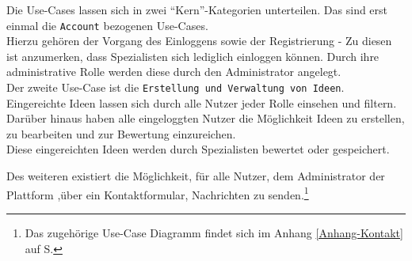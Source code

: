 Die Use-Cases lassen sich in zwei \enquote{Kern}-Kategorien unterteilen.
Das sind erst einmal die \texttt{Account} bezogenen Use-Cases.\\
Hierzu gehören der Vorgang des Einloggens sowie der Registrierung - Zu diesen ist anzumerken, dass Spezialisten sich lediglich einloggen können.
Durch ihre administrative Rolle werden diese durch den Administrator angelegt.\\
Der zweite Use-Case ist die \texttt{Erstellung und Verwaltung von Ideen}.\\
Eingereichte Ideen lassen sich durch alle Nutzer jeder Rolle einsehen und filtern. Darüber hinaus haben alle eingeloggten Nutzer die Möglichkeit Ideen zu erstellen, zu bearbeiten und zur Bewertung einzureichen.\\
Diese eingereichten Ideen werden durch Spezialisten bewertet oder gespeichert.

Des weiteren existiert die Möglichkeit, für alle Nutzer, dem Administrator der Plattform ,über ein Kontaktformular, Nachrichten zu senden.\footnote{Das zugehörige Use-Case Diagramm findet sich im Anhang \ref{Anhang-Kontakt} auf S.\pageref{Anhang-Kontakt}}